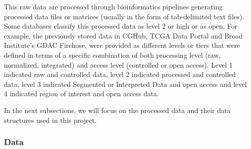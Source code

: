This raw data are processed through bioinformatics pipelines generating
processed data files or matrices (usually in the form of tab-delimited text files).
Some databases classify this processed data as level 2 or high or as open.
For example, the previously stored data in CGHub, TCGA Data Portal and Broad Institute’s GDAC Firehose, were provided as different levels or tiers that were defined in terms of a specific combination of both processing level (raw, normalized, integrated) and access level (controlled or open access). Level 1 indicated raw and controlled data, level 2 indicated processed and controlled data, level 3 indicated Segmented or Interpreted Data and open access and level 4 indicated region of interest and open access data.

In the next subsections, we will focus on the processed data and their data
structures used in this project.

\subsubsection{Data}

